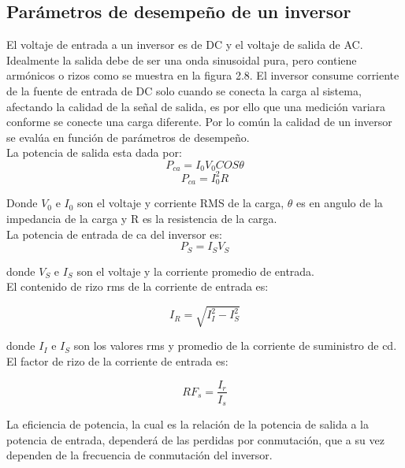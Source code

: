 \subsection{Parámetros de desempeño de un inversor}

El voltaje de entrada a un inversor es de DC y el voltaje de salida de AC. Idealmente la salida debe de ser una onda sinusoidal pura, pero contiene armónicos o rizos como se muestra en la figura 2.8. El inversor consume corriente de la fuente de entrada de DC solo cuando se conecta la carga al sistema, afectando la calidad de la señal de salida, es por ello que una medición variara conforme se conecte una carga diferente. Por lo común la calidad de un inversor se evalúa en función de parámetros de desempeño. \\

La potencia de salida esta dada por: \begin{equation}
P_{ca}=I_{0}V_{0}COS\theta
\end{equation}
\begin{equation}
P_{ca}= I_{0}^{2}R
\end{equation}

Donde $V_{0}$ e $I_{0}$ son el voltaje y corriente RMS de la carga, $\theta$ es en angulo de la impedancia de la carga y R es la resistencia de la carga.\\

La potencia de entrada de ca del inversor es:\\

\begin{equation}
P_{S}=I_{S}V_{S}
\end{equation}

donde $V_{S}$ e $I_{S}$ son el voltaje y la corriente promedio de entrada.\\

El contenido de rizo rms de la corriente de entrada es:

\begin{equation}
I_{R}=\sqrt{I_{I}^{2}-I_{S}^{2}}
\end{equation}

donde $I_{I}$ e $I_{S}$ son los valores rms y promedio de la corriente de suministro de cd.
El factor de rizo de la corriente de entrada es: 

\begin{equation}
RF_{s}=\dfrac{I_{r}}{I_{s}}
\end{equation}

La eficiencia de potencia, la cual es la relación de la potencia de salida a la potencia de entrada, dependerá de las perdidas por conmutación, que a su vez dependen de la frecuencia de conmutación del inversor.\\


